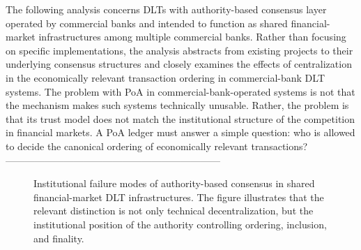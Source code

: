 \documentclass[
reprint,
showkeys,
superscriptaddress,
aps,
pra,
longbibliography,
nofootinbib,
]{revtex4-2}
\theoremstyle{definition}\newtheorem{definition}{Definition}
\begin{document}
The following analysis concerns DLTs with authority-based consensus layer operated by commercial banks and intended to function as shared financial-market infrastructures among multiple commercial banks.
Rather than focusing on specific implementations, the analysis abstracts from existing projects to their underlying consensus structures and closely examines the effects of centralization in the economically relevant transaction ordering in commercial-bank DLT systems.
The problem with PoA in commercial-bank-operated systems is not that the mechanism makes such systems technically unusable.
Rather, the problem is that its trust model does not match the institutional structure of the competition in financial markets.
A PoA ledger must answer a simple question: who is allowed to decide the canonical ordering of economically relevant transactions?
------------------------------------------------------------------
\begin{figure}[t]
	\centering
	\caption{Institutional failure modes of authority-based consensus in shared financial-market DLT infrastructures. The figure illustrates that the relevant distinction is not only technical decentralization, but the institutional position of the authority controlling ordering, inclusion, and finality.}
	\label{fig:poa-authority-allocation}
\end{figure}
\end{document}
